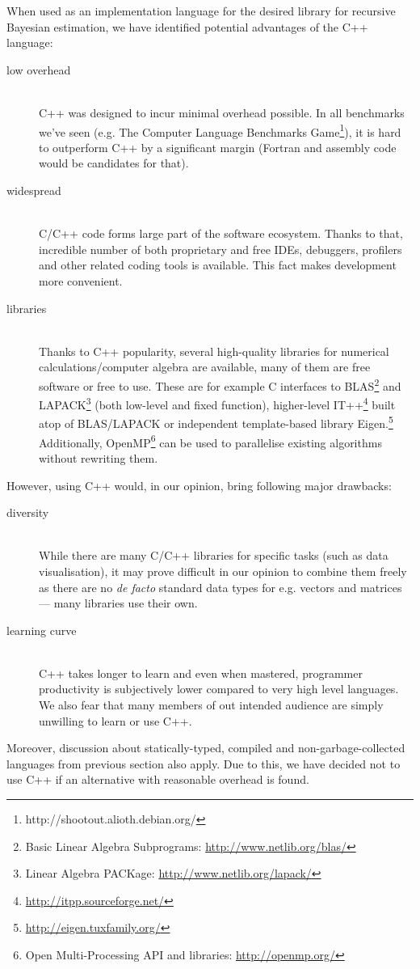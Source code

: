 When used as an implementation language for the desired library for recursive Bayesian estimation, we
have identified potential advantages of the C++ language:
\begin{description}
	\item[low overhead] \hfill \\
		C++ was designed to incur minimal overhead possible. In all benchmarks we've seen (e.g. The
		Computer Language Benchmarks Game\footnote{http://shootout.alioth.debian.org/}), it is
		hard to outperform C++ by a significant margin (Fortran and assembly code would be
		candidates for that).
	\item[widespread] \hfill \\
		C/C++ code forms large part of the software ecosystem. Thanks to that, incredible number of
		both proprietary and free IDEs, debuggers,
		profilers and other related coding tools is available. This fact makes development more
		convenient.
	\item[libraries] \hfill \\
		Thanks to C++ popularity, several high-quality libraries for numerical calculations/computer
		algebra are available, many of them are free software or free to use. These are for example
		C interfaces to BLAS\footnote{Basic Linear Algebra Subprograms: \url{http://www.netlib.org/blas/}}
		and LAPACK\footnote{Linear Algebra PACKage: \url{http://www.netlib.org/lapack/}} (both low-level
		and fixed function), higher-level IT++\footnote{\url{http://itpp.sourceforge.net/}} built
		atop of BLAS/LAPACK or independent template-based library
		Eigen.\footnote{\url{http://eigen.tuxfamily.org/}} Additionally,
		OpenMP\footnote{Open Multi-Processing API and libraries: \url{http://openmp.org/}}
		can be used to parallelise existing algorithms without rewriting them.
\end{description}
However, using C++ would, in our opinion, bring following major drawbacks:
\begin{description}
	\item[diversity] \hfill \\
		While there are many C/C++ libraries for specific tasks (such as data visualisation), it
		may prove difficult in our opinion to combine them freely as there are no \emph{de facto}
		standard data types for e.g. vectors and matrices --- many libraries use their own.
	\item[learning curve] \hfill \\
		C++ takes longer to learn and even when mastered, programmer productivity is subjectively
		lower compared to very high level languages. We also fear that many members of out intended
		audience are simply unwilling to learn or use C++.
\end{description}
Moreover, discussion about statically-typed, compiled and non-garbage-collected languages from
previous section also apply. Due to this, we have decided not to use C++ if an alternative with
reasonable overhead is found.

